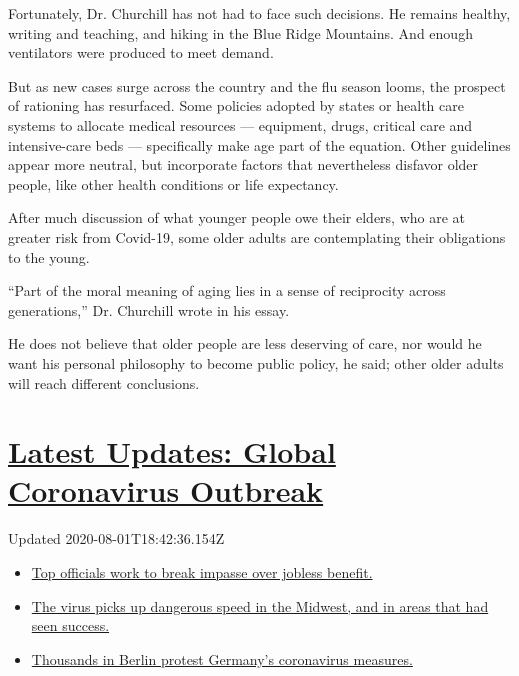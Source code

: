 Fortunately, Dr. Churchill has not had to face such decisions. He
remains healthy, writing and teaching, and hiking in the Blue Ridge
Mountains. And enough ventilators were produced to meet demand.

But as new cases surge across the country and the flu season looms, the
prospect of rationing has resurfaced. Some policies adopted by states or
health care systems to allocate medical resources --- equipment, drugs,
critical care and intensive-care beds --- specifically make age part of
the equation. Other guidelines appear more neutral, but incorporate
factors that nevertheless disfavor older people, like other health
conditions or life expectancy.

After much discussion of what younger people owe their elders, who are
at greater risk from Covid-19, some older adults are contemplating their
obligations to the young.

``Part of the moral meaning of aging lies in a sense of reciprocity
across generations,'' Dr. Churchill wrote in his essay.

He does not believe that older people are less deserving of care, nor
would he want his personal philosophy to become public policy, he said;
other older adults will reach different conclusions.

\hypertarget{latest-updates-global-coronavirus-outbreak}{%
\section{\texorpdfstring{\href{https://www.nytimes.com/2020/08/01/world/coronavirus-covid-19.html?action=click\&pgtype=Article\&state=default\&region=MAIN_CONTENT_1\&context=storylines_live_updates}{Latest
Updates: Global Coronavirus
Outbreak}}{Latest Updates: Global Coronavirus Outbreak}}\label{latest-updates-global-coronavirus-outbreak}}

Updated 2020-08-01T18:42:36.154Z

\begin{itemize}
\tightlist
\item
  \href{https://www.nytimes.com/2020/08/01/world/coronavirus-covid-19.html?action=click\&pgtype=Article\&state=default\&region=MAIN_CONTENT_1\&context=storylines_live_updates\#link-3ac56579}{Top
  officials work to break impasse over jobless benefit.}
\item
  \href{https://www.nytimes.com/2020/08/01/world/coronavirus-covid-19.html?action=click\&pgtype=Article\&state=default\&region=MAIN_CONTENT_1\&context=storylines_live_updates\#link-8796723}{The
  virus picks up dangerous speed in the Midwest, and in areas that had
  seen success.}
\item
  \href{https://www.nytimes.com/2020/08/01/world/coronavirus-covid-19.html?action=click\&pgtype=Article\&state=default\&region=MAIN_CONTENT_1\&context=storylines_live_updates\#link-25930521}{Thousands
  in Berlin protest Germany's coronavirus measures.}
\end{itemize}

